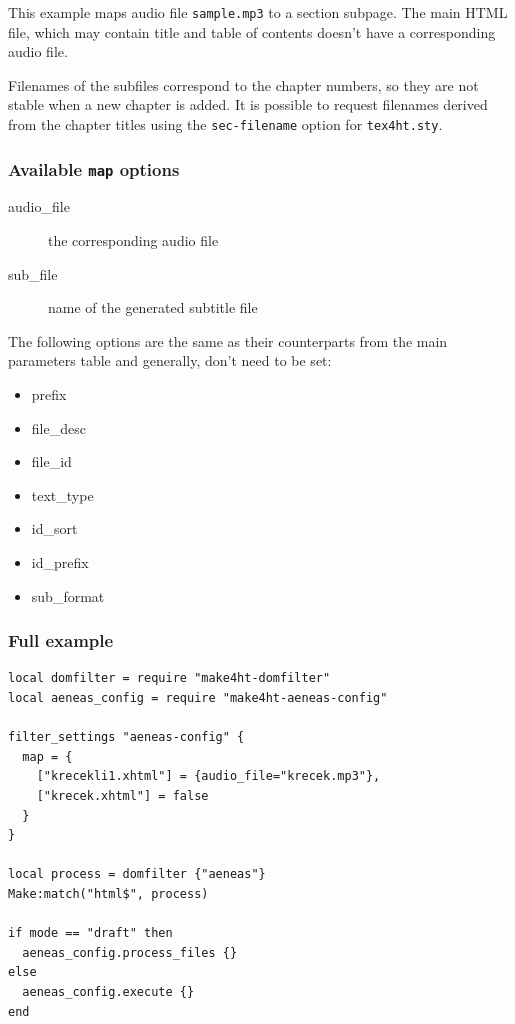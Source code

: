 This example maps audio file \texttt{sample.mp3} to a section subpage.
The main HTML file, which may contain title and table of contents
doesn't have a corresponding audio file.

Filenames of the subfiles correspond to the chapter numbers, so they are
not stable when a new chapter is added. It is possible to request
filenames derived from the chapter titles using the
\texttt{sec-filename} option for \texttt{tex4ht.sty}.

\subsubsection{\texorpdfstring{Available \texttt{map}
options}{Available map options}}\label{available-map-options}

\begin{description}
\item[audio\_file]
the corresponding audio file
\item[sub\_file]
name of the generated subtitle file
\end{description}

The following options are the same as their counterparts from the main
parameters table and generally, don't need to be set:

\begin{itemize}
\tightlist
\item
  prefix
\item
  file\_desc
\item
  file\_id
\item
  text\_type
\item
  id\_sort
\item
  id\_prefix
\item
  sub\_format
\end{itemize}

\subsubsection{Full example}\label{full-example}

\begin{verbatim}
local domfilter = require "make4ht-domfilter"
local aeneas_config = require "make4ht-aeneas-config"

filter_settings "aeneas-config" {
  map = {
    ["krecekli1.xhtml"] = {audio_file="krecek.mp3"}, 
    ["krecek.xhtml"] = false
  }
}

local process = domfilter {"aeneas"}
Make:match("html$", process)

if mode == "draft" then
  aeneas_config.process_files {}
else
  aeneas_config.execute {}
end
\end{verbatim}

